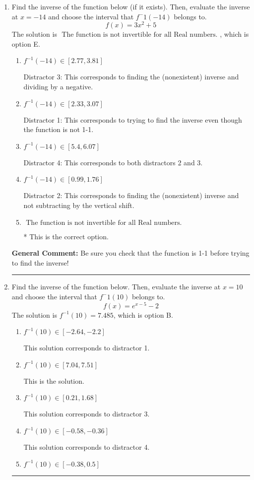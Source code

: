 \documentclass{extbook}[14pt]
\newcommand{\litem}[1]{\item #1

\rule{\textwidth}{0.4pt}}
\begin{document}
\begin{enumerate}\litem{
Find the inverse of the function below (if it exists). Then, evaluate the inverse at $x = -14$ and choose the interval that $f^-1(-14)$ belongs to.
\[ f(x) = 3 x^2 + 5 \]The solution is \( \text{ The function is not invertible for all Real numbers. } \), which is option E.\begin{enumerate}[label=\Alph*.]
\item \( f^{-1}(-14) \in [2.77, 3.81] \)

 Distractor 3: This corresponds to finding the (nonexistent) inverse and dividing by a negative.
\item \( f^{-1}(-14) \in [2.33, 3.07] \)

 Distractor 1: This corresponds to trying to find the inverse even though the function is not 1-1. 
\item \( f^{-1}(-14) \in [5.4, 6.07] \)

 Distractor 4: This corresponds to both distractors 2 and 3.
\item \( f^{-1}(-14) \in [0.99, 1.76] \)

 Distractor 2: This corresponds to finding the (nonexistent) inverse and not subtracting by the vertical shift.
\item \( \text{ The function is not invertible for all Real numbers. } \)

* This is the correct option.
\end{enumerate}

\textbf{General Comment:} Be sure you check that the function is 1-1 before trying to find the inverse!
}
\litem{
Find the inverse of the function below. Then, evaluate the inverse at $x = 10$ and choose the interval that $f^-1(10)$ belongs to.
\[ f(x) = e^{x-5}-2 \]The solution is \( f^{-1}(10) = 7.485 \), which is option B.\begin{enumerate}[label=\Alph*.]
\item \( f^{-1}(10) \in [-2.64, -2.2] \)

 This solution corresponds to distractor 1.
\item \( f^{-1}(10) \in [7.04, 7.51] \)

 This is the solution.
\item \( f^{-1}(10) \in [0.21, 1.68] \)

 This solution corresponds to distractor 3.
\item \( f^{-1}(10) \in [-0.58, -0.36] \)

 This solution corresponds to distractor 4.
\item \( f^{-1}(10) \in [-0.38, 0.5] \)


\end{enumerate}}
\end{enumerate}
\end{document}
